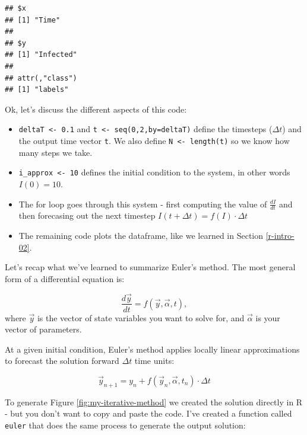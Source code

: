 \documentclass[
]{book}
\providecommand{\tightlist}{%
  \setlength{\itemsep}{0pt}\setlength{\parskip}{0pt}}
\theoremstyle{definition}
\theoremstyle{definition}
\theoremstyle{definition}
\theoremstyle{remark}
\begin{document}
\begin{verbatim}
## $x
## [1] "Time"
## 
## $y
## [1] "Infected"
## 
## attr(,"class")
## [1] "labels"
\end{verbatim}

Ok, let's discuss the different aspects of this code:

\begin{itemize}
\tightlist
\item
  \texttt{deltaT\ \textless{}-\ 0.1} and \texttt{t\ \textless{}-\ seq(0,2,by=deltaT)} define the timesteps (\(\Delta t\)) and the output time vector \texttt{t}. We also define \texttt{N\ \textless{}-\ length(t)} so we know how many steps we take.
\item
  \texttt{i\_approx\ \textless{}-\ 10} defines the initial condition to the system, in other words \(I(0)=10\).
\item
  The for loop goes through this system - first computing the value of \(\displaystyle \frac{dI}{dt}\) and then forecasing out the next timestep \(I(t+\Delta t) = f(I) \cdot \Delta t\)
\item
  The remaining code plots the dataframe, like we learned in Section \ref{r-intro-02}.
\end{itemize}

Let's recap what we've learned to summarize Euler's method. The most general form of a differential equation is:

\[ \displaystyle \frac{d\vec{y}}{dt} = f(\vec{y},\vec{\alpha},t), \]
where \(\vec{y}\) is the vector of state variables you want to solve for, and \(\vec{\alpha}\) is your vector of parameters.

At a given initial condition, Euler's method applies locally linear approximations to forecast the solution forward \(\Delta t\) time units:

\[ \vec{y}_{n+1} = y_{n} + f(\vec{y}_{n},\vec{\alpha},t_{n}) \cdot \Delta t \]

To generate Figure \ref{fig:my-iterative-method} we created the solution directly in R - but you don't want to copy and paste the code. I've created a function called \texttt{euler} that does the same process to generate the output solution:
\end{document}
